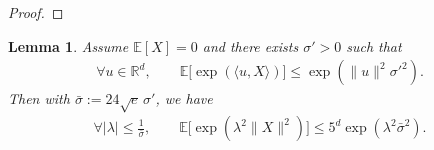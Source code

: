\documentclass[10pt]{article}
\newtheorem{lemma}[lemma]{Lemma}
\begin{document}
\begin{proof}
\end{proof}



\begin{lemma}\label{lem:mgf-to-norm}
Assume $\mathbb{E}[X]=0$ and there exists $\sigma'>0$ such that
\begin{align*}
\forall u\in\mathbb{R}^d,\qquad
\mathbb{E}\big[\exp(\langle u,X\rangle)\big] \le \exp(\|u\|^2\sigma'^2).
\end{align*}
Then with $\bar{\sigma}:=24\sqrt{e}\,\sigma'$, we have
\begin{align*}
\forall |\lambda|\le \frac{1}{\bar{\sigma}},\qquad
\mathbb{E}\big[\exp(\lambda^2\|X\|^2)\big]
\le 5^d \exp(\lambda^2\bar{\sigma}^2).
\end{align*}
\end{lemma}
\end{document}
